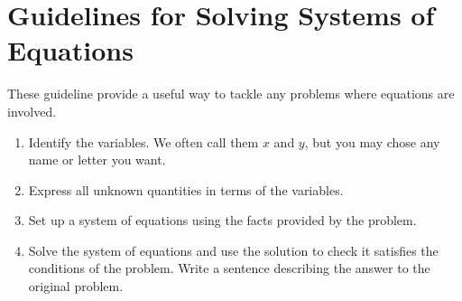 \section*{Guidelines for Solving Systems of Equations}
 These guideline provide a useful way to tackle any problems where equations are involved. 
 \begin{tcolorbox}
 	
  \begin{enumerate}\setlength\itemsep{0em}
 	\item Identify the variables. We often call them $x$ and $y$, but you may chose any name or letter you want. 	
 	\item Express all unknown quantities in terms of the variables. 	
 	\item Set up a system of equations using the facts provided by the problem.	
 	\item Solve the system of equations and use the solution to check it satisfies the conditions of the
 	problem. Write a sentence describing the answer to the original problem.  
 \end{enumerate}
\end{tcolorbox}
 
